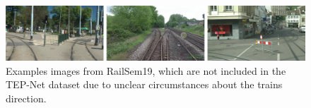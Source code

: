 \begin{figure}[!htbp]
    \centering
    \includegraphics[width=\linewidth]{PICs/TEP-Net dataset bilder aussortiert.png}
    \caption{Examples images from RailSem19, which are not included in the \ac{TEP}-Net dataset due to unclear circumstances about the trains direction. \cite{tepNet2024}}
    \label{tep-net_aussortiert}
\end{figure}


\begin{figure}[htbp]
    \centering
    

\end{figure}

